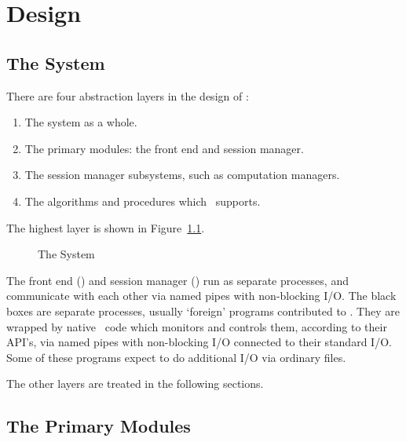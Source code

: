 

\chapter{Design}


\section{The System}

There are four abstraction layers in the design of \magnus:

\begin{enumerate}

\item
The system as a whole.

\item
The primary modules: the front end and session manager.

\item
The session manager subsystems, such as computation managers.

\item
The algorithms and procedures which \magnus\ supports.

\end{enumerate}

The highest layer is shown in Figure~\ref{arch}.

\begin{figure}[htbp]
\caption{The System}\label{arch}
\end{figure}

The front end (\FE) and session manager (\SM) run as separate
processes, and communicate with each other via named pipes with
non-blocking I/O. The black boxes are separate processes, usually
`foreign' programs contributed to \magnus. They are wrapped by native
\magnus\ code which monitors and controls them, according to their
API's, via named pipes with non-blocking I/O connected to their
standard I/O.  Some of these programs expect to do additional I/O via
ordinary files.

The other layers are treated in the following sections.


\section{The Primary Modules}

